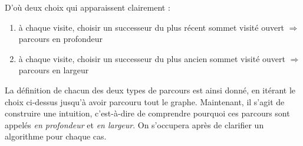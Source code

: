 \documentclass[../../../main.tex]{subfiles}
\begin{document}
D'où deux choix qui apparaissent clairement :
\begin{enumerate}
	\item à chaque visite, choisir un successeur du plus récent sommet visité ouvert $\Rightarrow$ parcours en profondeur
	\item à chaque visite, choisir un successeur du plus ancien sommet visité ouvert $\Rightarrow$ parcours en largeur
\end{enumerate}
La définition de chacun des deux types de parcours est ainsi donné, en itérant le choix ci-dessus jusqu'à avoir parcouru tout le graphe. Maintenant, il s'agit de construire une intuition, c'est-à-dire de comprendre pourquoi ces parcours sont appelés \textit{en profondeur} et \textit{en largeur}. On s'occupera après de clarifier un algorithme pour chaque cas.
\end{document}
